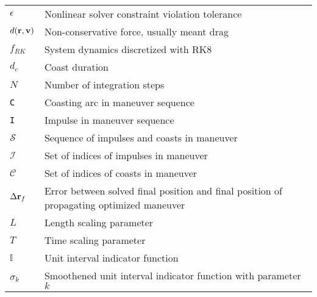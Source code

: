 \begin{longtable}{ll}
\(\epsilon\) & Nonlinear solver constraint violation tolerance \\
\(d(\mathbf{r}, \mathbf{v})\) & Non-conservative force, usually meant drag \\
\(f_{RK}\) & System dynamics discretized with RK8 \\
\(d_c\) & Coast duration \\
\(N\) & Number of integration steps \\
\texttt{C} & Coasting arc in maneuver sequence \\
\texttt{I} & Impulse in maneuver sequence \\
\(\mathcal{S}\) & Sequence of impulses and coasts in maneuver \\
\(\mathcal{I}\) & Set of indices of impulses in maneuver \\
\(\mathcal{C}\) & Set of indices of coasts in maneuver \\
\(\Delta \mathbf{r}_f\) & Error between solved final position and final position of propagating optimized maneuver \\
\(L\) & Length scaling parameter \\
\(T\) & Time scaling parameter \\
\(\mathbb{I}\) & Unit interval indicator function \\
\(\sigma_k\) & Smoothened unit interval indicator function with parameter \(k\) \\
\end{longtable}


